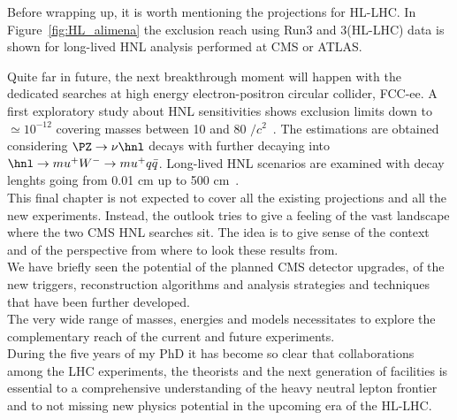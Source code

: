 Before wrapping up, it is worth mentioning the projections for
HL-LHC. In Figure~\ref{fig:HL_alimena} the exclusion reach using Run3
and 3\abinv (HL-LHC) data is shown for long-lived HNL analysis
performed at CMS or ATLAS. 

Quite far in future, the next breakthrough moment will happen with the
dedicated searches at high energy electron-positron circular collider,
FCC-ee. A first exploratory study about HNL sensitivities shows exclusion limits
down to \mixpar $\simeq 10^{-12}$ covering \hnl masses between 10 and
80 \GeV$/c^2$~\cite{blondel2014search}. The estimations are obtained
considering $\PZ \rightarrow \nu \hnl$ decays with \hnl further
decaying into
$\hnl \rightarrow mu^{+} W^{-} \rightarrow mu^{+}
q\bar{q}$. Long-lived HNL scenarios are examined with decay lenghts
going from 0.01 cm up to 500 cm~\cite{blondel2014search}.\\


This final chapter is not expected to cover all the existing projections and all the new
experiments. 
Instead, the outlook tries to give a feeling of the vast landscape
where the two CMS HNL searches sit. The idea is to give sense of the
context and of the perspective from where to look these results
from. \\
We have briefly seen the potential of the planned CMS detector
upgrades, of the new triggers,
reconstruction algorithms and analysis strategies and techniques that
have been further developed. \\
The very wide range of masses, energies and models necessitates to
explore the complementary reach of the current and future experiments.\\
During the five years of my PhD it has become so clear that collaborations
among the LHC experiments, the theorists and the next generation of
facilities is essential to a comprehensive
understanding of the heavy neutral lepton frontier and to not missing
new physics potential in the upcoming era of the HL-LHC.






















